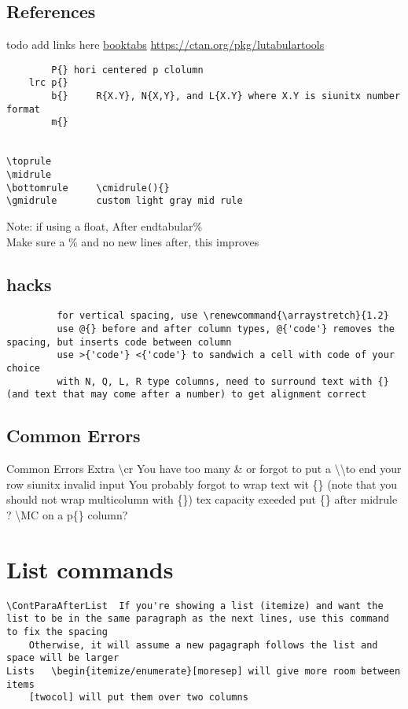 \documentclass{corpboreport}
\begin{document}
\subsection{References}

todo add links here
\url{booktabs}
\url{https://ctan.org/pkg/lutabulartools}

\begin{lstlisting}
		P{} hori centered p clolumn
	lrc	p{}
		b{}		R{X.Y}, N{X,Y}, and L{X.Y} where X.Y is siunitx number format
		m{}


\toprule
\midrule
\bottomrule		\cmidrule(){}
\gmidrule		custom light gray mid rule

\end{lstlisting}

Note: if using a float,
After end{tabular}\%\\
Make sure a \% and no new lines after, this improves

\subsection{hacks}
\begin{lstlisting}
		 for vertical spacing, use \renewcommand{\arraystretch}{1.2}
		 use @{} before and after column types, @{'code'} removes the spacing, but inserts code between column
		 use >{'code'} <{'code'} to sandwich a cell with code of your choice
		 with N, Q, L, R type columns, need to surround text with {} (and text that may come after a number) to get alignment correct
\end{lstlisting}


\subsection{Common Errors}
Common Errors
	Extra \textbackslash cr	You have too many \& or forgot to put a \textbackslash\textbackslash to end your row
	siunitx invalid input	You probably forgot to wrap text wit \{\}  (note that you should not wrap multicolumn with \{\})
	tex capacity exeeded	put \{\} after midrule ?
	\textbackslash MC on a p\{\} column?


\section{List commands}

\begin{lstlisting}
\ContParaAfterList	If you're showing a list (itemize) and want the list to be in the same paragraph as the next lines, use this command to fix the spacing
	Otherwise, it will assume a new pagagraph follows the list and space will be larger
Lists	\begin{itemize/enumerate}[moresep] will give more room between items
	[twocol] will put them over two columns
\end{lstlisting}
\end{document}
